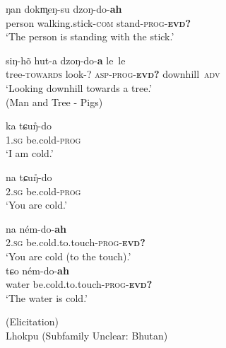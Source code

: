 \begin{exe}
\ex \label{e:Methods:LhokpuVerbal}
\begin{xlist}

\ex \label{e:Methods:LhokpuVerbal:coda}
\gll ŋan dokm̥eŋ-su dzoŋ-do-\textbf{ah} \\
person walking.stick-\textsc{com} stand-\textsc{prog-\textbf{evd?}} \\
\glt `The person is standing with the stick.'

\ex \label{e:Methods:LhokpuVerbal:nocoda}
\gll siŋ-hõ hut-a dzoŋ-do-\textbf{a} le~le \\
tree-\textsc{towards} look-? \textsc{asp-prog-\textbf{evd?}} downhill~\textsc{adv} \\
\glt `Looking downhill towards a tree.' \\
(Man and Tree - Pigs)


\end{xlist}

\end{exe}

\begin{exe}
\ex \label{e:Methods:LhokpuVerbal2}
\begin{xlist}

\ex \label{e:Methods:LhokpuVerbal:cold}
\gll ka tɕuŋ̊-do \\
\textsc{1.sg} be.cold-\textsc{prog} \\
\glt `I am cold.'

\ex \label{e:Methods:LhokpuVerbal:cold2s}
\gll * na tɕuŋ̊-do \\
{} \textsc{2.sg} be.cold-\textsc{prog} \\
\glt *`You are cold.'

\ex \label{e:Methods:LhokpuVerbal:coldevid2}
\gll na ném-do-\textbf{ah} \\
\textsc{2.sg} be.cold.to.touch-\textsc{prog-\textbf{evd?}} \\
\glt `You are cold (to the touch).' \\


\ex \label{e:Methods:LhokpuVerbal:coldevid}
\gll tɕo ném-do-\textbf{ah} \\
water be.cold.to.touch-\textsc{prog-\textbf{evd?}} \\
\glt `The water is cold.' \\

\end{xlist}
(Elicitation) \\ 
Lhokpu (Subfamily Unclear: Bhutan)
\end{exe}


